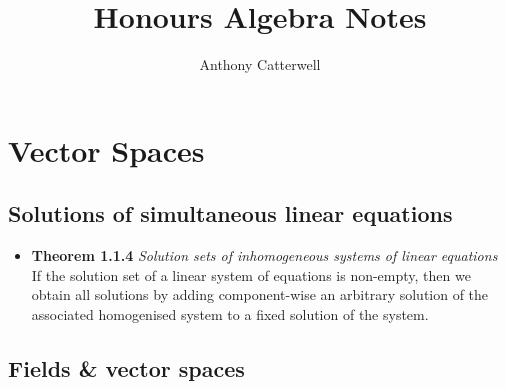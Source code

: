 \documentclass[11pt,a4paper]{article}
\title{Honours Algebra Notes}
\author{Anthony Catterwell}
\begin{document}
\maketitle
\tableofcontents

\break{}

\section{Vector Spaces}

\subsection{Solutions of simultaneous linear equations}

\begin{itemize}

    \item \textbf{Theorem 1.1.4} \emph{Solution sets of inhomogeneous systems of linear
        equations} \\
        If the solution set of a linear system of equations is non-empty,
        then we obtain all solutions by adding component-wise an arbitrary solution
        of the associated homogenised system to a fixed solution of the system.

\end{itemize}

\subsection{Fields \& vector spaces}
\end{document}
